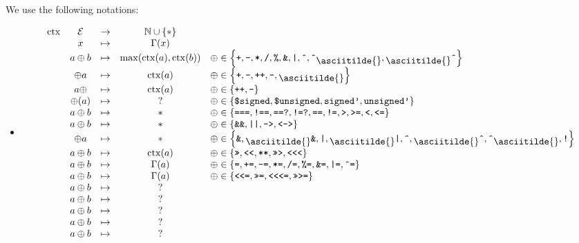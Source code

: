 \documentclass{article}
\DeclareMathOperator{\ctx}{ctx}
\newcommand{\mytilde}{\raisebox{-.7ex}{\asciitilde{}}}
\newcommand{\binOp}{\ensuremath{\left\{
      \texttt{+}, \texttt{-}, \texttt{*}, \texttt{/}, \texttt{\%}, \texttt{\&},
      \texttt{|}, \texttt{\^{}}, \texttt{\^{}}\mytilde, \mytilde\texttt{\^{}}
      \right\}}}
\newcommand{\preUnOp}{\ensuremath{\left\{
      \texttt{+}, \texttt{-}, \texttt{++}, \texttt{--}, \mytilde
    \right\}}}
\newcommand{\postUnOp}{\ensuremath{\left\{\texttt{++}, \texttt{--}\right\}}}
\newcommand{\cast}{\ensuremath{\left\{
      \texttt{\$signed}, \texttt{\$unsigned}, \texttt{signed'}, \texttt{unsigned'}
    \right\}}}
\newcommand{\comp}{\ensuremath{\left\{
      \texttt{===}, \texttt{!==}, \texttt{==?}, \texttt{!=?}, \texttt{==},
      \texttt{!=}, \texttt{>}, \texttt{>=}, \texttt{<}, \texttt{<=}
    \right\}}}
\newcommand{\logic}{\ensuremath{\left\{
      \texttt{\&\&}, \texttt{||}, \texttt{->}, \texttt{<->}
    \right\}}}
\newcommand{\red}{\ensuremath{\left\{
      \texttt{\&}, \mytilde\texttt{\&}, \texttt{|}, \mytilde\texttt{|}, \texttt{\^{}},
      \mytilde\texttt{\^{}}, \texttt{\^{}}\mytilde, \texttt{!}
    \right\}}}
\newcommand{\shift}{\ensuremath{\left\{
      \texttt{>>}, \texttt{<}\texttt{<}, \texttt{**}, \texttt{>>>},
      \texttt{<}\texttt{<}\texttt{<}
    \right\}}}
\newcommand{\assignBinOp}{\ensuremath{\left\{
      \texttt{=}, \texttt{+=}, \texttt{-=}, \texttt{*=}, \texttt{/=},
      \texttt{\%=}, \texttt{\&=}, \texttt{|=}, \texttt{\^{}=}
    \right\}}}
\newcommand{\assignShift}{\ensuremath{\left\{
      \texttt{<}\texttt{<=}, \texttt{>>=},
      \texttt{<}\texttt{<}\texttt{<=}, \texttt{>>>=}
    \right\}}}
\begin{document}
We use the following notations:
\begin{itemize}
  \item
        \begin{equation*}
          \begin{array}{ccccl}
            \ctx & \mathcal{E} & \to     & \mathbb{N} \cup \{\ast\}                           \\
                 & x           & \mapsto & \Gamma(x)                                          \\
                 & a \oplus b  & \mapsto & \max(\ctx(a), \ctx(b))   & \oplus \in \binOp       \\
                 & \oplus a    & \mapsto & \ctx(a)                  & \oplus \in \preUnOp     \\
                 & a \oplus    & \mapsto & \ctx(a)                  & \oplus \in \postUnOp    \\
                 & \oplus(a)   & \mapsto & ?                        & \oplus \in \cast        \\
                 & a \oplus b  & \mapsto & \ast                     & \oplus \in \comp        \\
                 & a \oplus b  & \mapsto & \ast                     & \oplus \in \logic       \\
                 & \oplus a    & \mapsto & \ast                     & \oplus \in \red         \\
                 & a \oplus b  & \mapsto & \ctx(a)                  & \oplus \in \shift       \\
                 & a \oplus b  & \mapsto & \Gamma(a)                & \oplus \in \assignBinOp \\
                 & a \oplus b  & \mapsto & \Gamma(a)                & \oplus \in \assignShift \\
                 & a \oplus b  & \mapsto & ?                                                  \\
                 & a \oplus b  & \mapsto & ?                                                  \\
                 & a \oplus b  & \mapsto & ?                                                  \\
                 & a \oplus b  & \mapsto & ?                                                  \\
                 & a \oplus b  & \mapsto & ?                                                  \\
          \end{array}
        \end{equation*}
\end{itemize}
\end{document}
